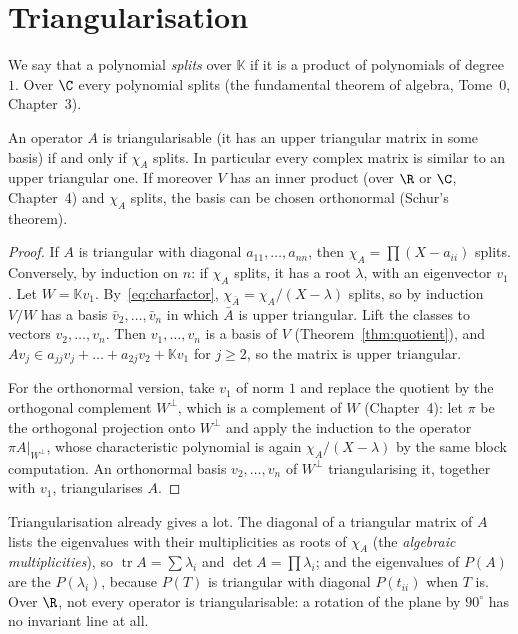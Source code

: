 \section{Triangularisation}

We say that a polynomial \emph{splits} over $\mathbb K$ if it is a product of polynomials of degree $1$. Over $\C$ every
polynomial splits (the fundamental theorem of algebra, Tome~0, Chapter~3).

\begin{theorem}[triangularisation]\label{thm:schur}
An operator $A$ is triangularisable (it has an upper triangular matrix in some basis) if and only if $\chi_A$ splits.
In particular every complex matrix is similar to an upper triangular one. If moreover $V$ has an inner product (over $\R$
or $\C$, Chapter~4) and $\chi_A$ splits, the basis can be chosen orthonormal (Schur's theorem).
\end{theorem}
\begin{proof}
If $A$ is triangular with diagonal $a_{11},\dots,a_{nn}$, then $\chi_A=\prod(X-a_{ii})$ splits. Conversely, by induction on
$n$: if $\chi_A$ splits, it has a root $\lambda$, with an eigenvector $v_1$. Let $W=\mathbb Kv_1$. By~\eqref{eq:charfactor},
$\chi_{\bar A}=\chi_A/(X-\lambda)$ splits, so by induction $V/W$ has a basis $\bar v_2,\dots,\bar v_n$ in which $\bar A$ is
upper triangular. Lift the classes to vectors $v_2,\dots,v_n$. Then $v_1,\dots,v_n$ is a basis of $V$ (Theorem~\ref{thm:quotient}),
and $Av_j\in a_{jj}v_j+\dots+a_{2j}v_2+\mathbb Kv_1$ for $j\ge2$, so the matrix is upper triangular.

For the orthonormal version, take $v_1$ of norm $1$ and replace the quotient by the orthogonal complement $W^\perp$, which
is a complement of $W$ (Chapter~4): let $\pi$ be the orthogonal projection onto $W^\perp$ and apply the induction to
the operator $\pi A|_{W^\perp}$, whose characteristic polynomial is again $\chi_A/(X-\lambda)$ by the same block computation.
An orthonormal basis $v_2,\dots,v_n$ of $W^\perp$ triangularising it, together with $v_1$, triangularises $A$.
\end{proof}

Triangularisation already gives a lot. The diagonal of a triangular matrix of $A$ lists the eigenvalues with their
multiplicities as roots of $\chi_A$ (the \emph{algebraic multiplicities}), so $\operatorname{tr}A=\sum\lambda_i$ and
$\det A=\prod\lambda_i$; and the eigenvalues of $P(A)$ are the $P(\lambda_i)$, because $P(T)$ is triangular with diagonal
$P(t_{ii})$ when $T$ is. Over $\R$, not every operator is triangularisable: a rotation of the plane by $90^\circ$ has no
invariant line at all.

